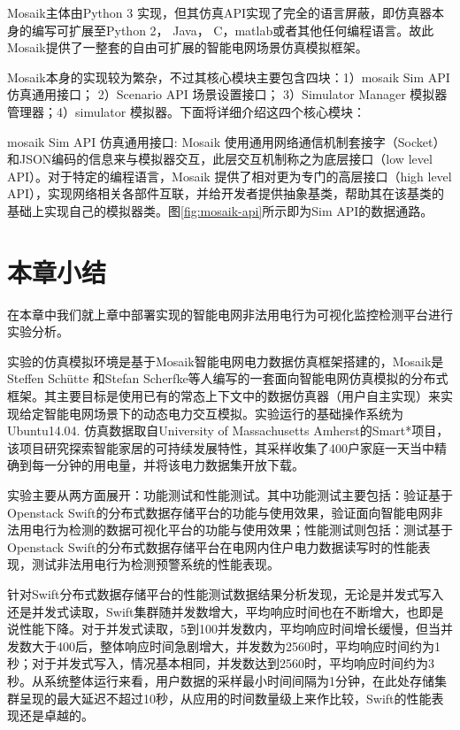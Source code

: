 Mosaik主体由Python 3 实现，但其仿真API实现了完全的语言屏蔽，即仿真器本身的编写可扩展至Python 2， Java， C，matlab或者其他任何编程语言。故此Mosaik提供了一整套的自由可扩展的智能电网场景仿真模拟框架。

Mosaik本身的实现较为繁杂，不过其核心模块主要包含四块：1）mosaik Sim API 仿真通用接口； 2）Scenario API 场景设置接口； 3）Simulator Manager 模拟器管理器；4）simulator 模拟器。下面将详细介绍这四个核心模块：

mosaik Sim API 仿真通用接口: Mosaik 使用通用网络通信机制套接字（Socket）和JSON编码的信息来与模拟器交互，此层交互机制称之为底层接口（low level API）。对于特定的编程语言，Mosaik 提供了相对更为专门的高层接口（high level API），实现网络相关各部件互联，并给开发者提供抽象基类，帮助其在该基类的基础上实现自己的模拟器类。图\ref{fig:mosaik-api}所示即为Sim API的数据通路。
    

\section{本章小结}

在本章中我们就上章中部署实现的智能电网非法用电行为可视化监控检测平台进行实验分析。

实验的仿真模拟环境是基于Mosaik智能电网电力数据仿真框架搭建的，Mosaik是Steffen Schütte 和Stefan Scherfke等人编写的一套面向智能电网仿真模拟的分布式框架。其主要目标是使用已有的常态上下文中的数据仿真器（用户自主实现）来实现给定智能电网场景下的动态电力交互模拟。实验运行的基础操作系统为Ubuntu14.04. 仿真数据取自University of Massachusetts Amherst的Smart*项目，该项目研究探索智能家居的可持续发展特性，其采样收集了400户家庭一天当中精确到每一分钟的用电量，并将该电力数据集开放下载。

实验主要从两方面展开：功能测试和性能测试。其中功能测试主要包括：验证基于Openstack Swift的分布式数据存储平台的功能与使用效果，验证面向智能电网非法用电行为检测的数据可视化平台的功能与使用效果；性能测试则包括：测试基于Openstack Swift的分布式数据存储平台在电网内住户电力数据读写时的性能表现，测试非法用电行为检测预警系统的性能表现。

针对Swift分布式数据存储平台的性能测试数据结果分析发现，无论是并发式写入还是并发式读取，Swift集群随并发数增大，平均响应时间也在不断增大，也即是说性能下降。对于并发式读取，5到100并发数内，平均响应时间增长缓慢，但当并发数大于400后，整体响应时间急剧增大，并发数为2560时，平均响应时间约为1秒；对于并发式写入，情况基本相同，并发数达到2560时，平均响应时间约为3秒。从系统整体运行来看，用户数据的采样最小时间间隔为1分钟，在此处存储集群呈现的最大延迟不超过10秒，从应用的时间数量级上来作比较，Swift的性能表现还是卓越的。

